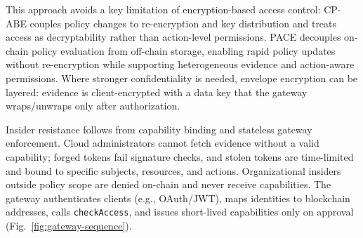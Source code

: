 \documentclass[pdflatex,sn-mathphys-num]{sn-jnl}
\begin{document}
This approach avoids a key limitation of encryption-based access control: CP-ABE couples policy changes to re-encryption and key distribution and treats access as decryptability rather than action-level permissions. PACE decouples on-chain policy evaluation from off-chain storage, enabling rapid policy updates without re-encryption while supporting heterogeneous evidence and action-aware permissions. Where stronger confidentiality is needed, envelope encryption can be layered: evidence is client-encrypted with a data key that the gateway wraps/unwraps only after authorization.

Insider resistance follows from capability binding and stateless gateway enforcement. Cloud administrators cannot fetch evidence without a valid capability; forged tokens fail signature checks, and stolen tokens are time-limited and bound to specific subjects, resources, and actions. Organizational insiders outside policy scope are denied on-chain and never receive capabilities. The gateway authenticates clients (e.g., OAuth/JWT), maps identities to blockchain addresses, calls \texttt{checkAccess}, and issues short-lived capabilities only on approval (Fig.~\ref{fig:gateway-sequence}).
\end{document}
